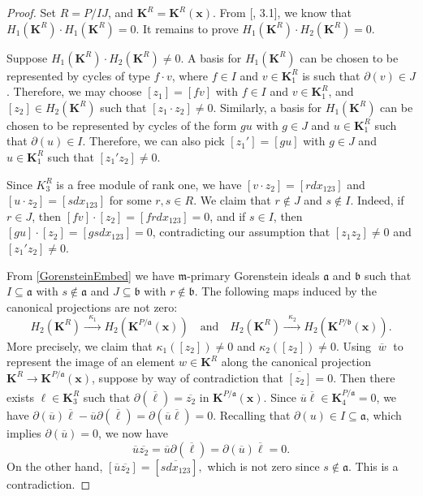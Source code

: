 \documentclass[10pt,reqno]{amsart}
\theoremstyle{definition}
\theoremstyle{remark}
\numberwithin{equation}{section}
\newcommand{\m}{\mathfrak m}
\numberwithin{equation}{section}
\begin{document}
\begin{proof}
     Set $R=P/IJ$, and $\textbf{K}^R=\mathbf{K}^R(\textbf{x})$. From [\cite{vandebogert2022products}, 3.1], we know that $H_1(\mathbf{K}^R)\cdot H_1(\mathbf{K}^R)=0$. It remains to prove $ H_1(\mathbf{K}^R)\cdot H_2(\mathbf{K}^R)=0$. 
     
     Suppose $H_1(\mathbf K^{R})\cdot H_2(\mathbf K^{R})\neq 0$. A basis for $ H_1(\mathbf K^{R})$ can be chosen to be represented by cycles of type $f\cdot v$, where $f\in I$ and $v\in \mathbf K^{R}_1$ is such that $\partial(v)\in J$. Therefore, we may choose $[z_1]=[fv]$ with $f\in I$ and $v\in \mathbf K^{R}_1$, and $[z_2]\in H_2(\mathbf K^{R})$ such that $[z_1\cdot z_2]\ne 0$. Similarly, a basis for $H_1(\mathbf K^{R})$ can be chosen to be represented by cycles of the form $gu$ with $g\in J$ and $u\in \mathbf K^{R}_1$ such that $\partial (u)\in I$. Therefore, we can also pick $[z_1']=[gu]$ with $g\in J$ and $u\in \mathbf K^{R}_1$ such that $[z_1'z_2]\ne 0$. 
     
     
     
     
     Since $K^{R}_3$ is a free module of rank one, we have  $[v\cdot z_2]=[rdx_{123}]$ and $[u\cdot z_2]=[sdx_{123}]$ for some $r, s\in R$.
     We claim that $r\notin J$ and $s\notin I$.
     Indeed, if $r\in J$, then $ [fv]\cdot [z_2]=[frdx_{123}]=0$, and if $s\in I$, then $ [gu]\cdot [z_2]=[gsdx_{123}]=0$, contradicting our assumption that $[z_1z_2]\ne 0$ and $[z_1'z_2]\ne 0$.
     
      From \cref{GorensteinEmbed} we have $\m$-primary Gorenstein ideals $\mathfrak a$ and $\mathfrak b$ such that $I\subseteq \mathfrak a$ with $s\notin \mathfrak a$ and $J\subseteq \mathfrak b$ with $r\notin \mathfrak b$. The following maps induced by the canonical projections are not zero:\[
    H_{2}(\mathbf{K}^R)\xrightarrow[]{\;\;\kappa_1\;\;}H_{2}(\mathbf{K}^{P/\mathfrak a}(\textbf{x}))\quad\text{and}\quad H_2(\mathbf{K}^R)\xrightarrow[]{\;\;\kappa_2\;\;}H_{2}(\mathbf{K}^{P/\mathfrak b}(\textbf{x})).
    \] 
    More precisely, we claim that  $ \kappa_1([z_2])\ne 0$ and $\kappa_2([z_2])\ne 0$. Using $\overline{\;w\;}$ to represent the image of an element $w\in\mathbf{K}^R$ along the canonical projection $\mathbf{K}^R\xrightarrow[]{} \mathbf{K}^{P/\mathfrak a}(\textbf{x})$, suppose by way of contradiction that $\overline{[z_2]}=0$. Then there exists $\ell\in \mathbf{K}^R_3$ such that $\partial(\overline{\ell})=\overline{z_2}$ in $ \mathbf{K}^{P/\mathfrak a}(\textbf{x})$. Since $\overline{u}\overline{\ell} \in \mathbf K_4^{P/\mathfrak a}=0$, we have $\partial(\overline{u})\overline{\ell}-\overline{u}\partial(\overline{\ell})=\partial(\overline{u}\overline{\ell})=0$. Recalling that $\partial(u)\in I\subseteq \mathfrak a$, which implies $\partial(\overline{u})=0$, we now have 
    $$
\overline{u}\overline{z_2}=\overline{u}\partial(\overline{\ell}) =\partial(\overline {u})\overline{\ell}=0.
    $$
    On the other hand, $[\overline{u}\overline{z_2}]=[\overline{sdx_{123}}],$ which is not zero since $s\notin \mathfrak a$. This is a contradiction.
    

\end{proof}
\end{document}
